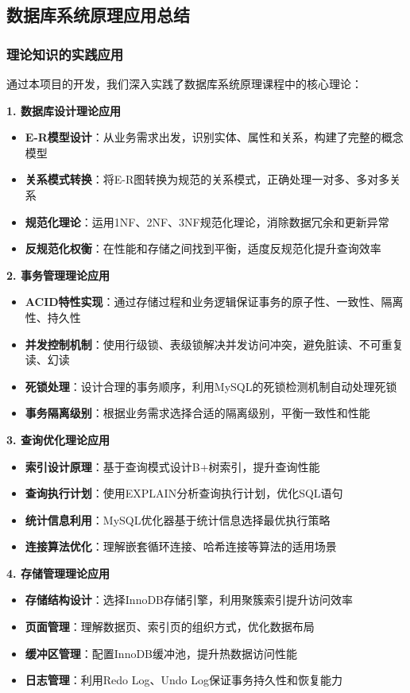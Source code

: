 \documentclass[12pt,a4paper]{article}
\begin{document}
\subsection{数据库系统原理应用总结}

\subsubsection{理论知识的实践应用}
通过本项目的开发，我们深入实践了数据库系统原理课程中的核心理论：

\textbf{1. 数据库设计理论应用}
\begin{itemize}
    \item \textbf{E-R模型设计}：从业务需求出发，识别实体、属性和关系，构建了完整的概念模型
    \item \textbf{关系模式转换}：将E-R图转换为规范的关系模式，正确处理一对多、多对多关系
    \item \textbf{规范化理论}：运用1NF、2NF、3NF规范化理论，消除数据冗余和更新异常
    \item \textbf{反规范化权衡}：在性能和存储之间找到平衡，适度反规范化提升查询效率
\end{itemize}

\textbf{2. 事务管理理论应用}
\begin{itemize}
    \item \textbf{ACID特性实现}：通过存储过程和业务逻辑保证事务的原子性、一致性、隔离性、持久性
    \item \textbf{并发控制机制}：使用行级锁、表级锁解决并发访问冲突，避免脏读、不可重复读、幻读
    \item \textbf{死锁处理}：设计合理的事务顺序，利用MySQL的死锁检测机制自动处理死锁
    \item \textbf{事务隔离级别}：根据业务需求选择合适的隔离级别，平衡一致性和性能
\end{itemize}

\textbf{3. 查询优化理论应用}
\begin{itemize}
    \item \textbf{索引设计原理}：基于查询模式设计B+树索引，提升查询性能
    \item \textbf{查询执行计划}：使用EXPLAIN分析查询执行计划，优化SQL语句
    \item \textbf{统计信息利用}：MySQL优化器基于统计信息选择最优执行策略
    \item \textbf{连接算法优化}：理解嵌套循环连接、哈希连接等算法的适用场景
\end{itemize}

\textbf{4. 存储管理理论应用}
\begin{itemize}
    \item \textbf{存储结构设计}：选择InnoDB存储引擎，利用聚簇索引提升访问效率
    \item \textbf{页面管理}：理解数据页、索引页的组织方式，优化数据布局
    \item \textbf{缓冲区管理}：配置InnoDB缓冲池，提升热数据访问性能
    \item \textbf{日志管理}：利用Redo Log、Undo Log保证事务持久性和恢复能力
\end{itemize}
\end{document}
